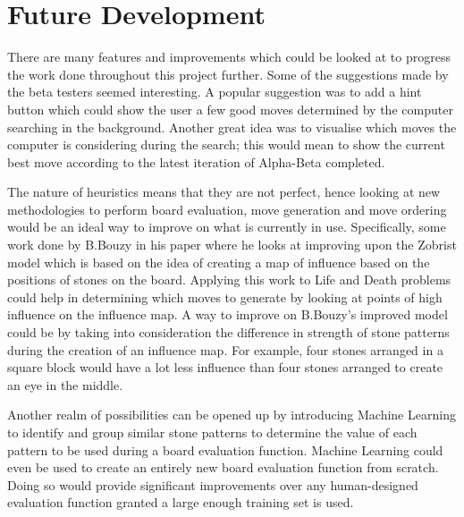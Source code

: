 \documentclass{l4proj}
\begin{document}
\section{Future Development}
There are many features and improvements which could be looked at to progress the work done throughout this project further. Some of the suggestions made by the beta testers seemed interesting. A popular suggestion was to add a hint button which could show the user a few good moves determined by the computer searching in the background. Another great idea was to visualise which moves the computer is considering during the search; this would mean to show the current best move according to the latest iteration of Alpha-Beta completed.

The nature of heuristics means that they are not perfect, hence looking at new methodologies to perform board evaluation, move generation and move ordering would be an ideal way to improve on what is currently in use. Specifically, some work done by B.Bouzy in his paper \citep{Bouzy2003} where he looks at improving upon the Zobrist model \citep{Zobrist1969} which is based on the idea of creating a map of influence based on the positions of stones on the board. Applying this work to Life and Death problems could help in determining which moves to generate by looking at points of high influence on the influence map. A way to improve on B.Bouzy's improved model could be by taking into consideration the difference in strength of stone patterns during the creation of an influence map. For example, four stones arranged in a square block would have a lot less influence than four stones arranged to create an eye in the middle.

Another realm of possibilities can be opened up by introducing Machine Learning to identify and group similar stone patterns to determine the value of each pattern to be used during a board evaluation function. Machine Learning could even be used to create an entirely new board evaluation function from scratch. Doing so would provide significant improvements over any human-designed evaluation function granted a large enough training set is used.
\end{document}
